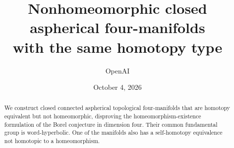 \documentclass[11pt]{article}
\title{Nonhomeomorphic closed aspherical four-manifolds\\
with the same homotopy type}
\author{OpenAI}
\date{October 4, 2026}
\theoremstyle{definition}
\theoremstyle{remark}
\numberwithin{equation}{section}
\begin{document}
\maketitle
\begin{abstract}
We construct closed connected aspherical topological four-manifolds
that are homotopy equivalent but not homeomorphic, disproving the
homeomorphism-existence formulation of the Borel conjecture in dimension
four.  Their common
fundamental group is word-hyperbolic.  One of the manifolds also has a
self-homotopy equivalence not homotopic to a homeomorphism.
\end{abstract}











\end{document}
